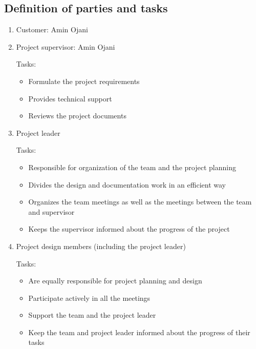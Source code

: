 \documentclass[a4paper,12pt]{article} \usepackage{graphicx}
\begin{document}
\subsection{Definition of parties and tasks}
\begin{enumerate}
        \item{Customer: Amin Ojani}
        \item{Project supervisor: Amin Ojani}

                Tasks:
                \begin{itemize}
                        \item{Formulate the project requirements}
                        \item{Provides technical support}
                        \item{Reviews the project documents}
                \end{itemize}
        \item{Project leader}

                Tasks:
                \begin{itemize}
                        \item{Responsible for organization of the team and the project planning}
                        \item{Divides the design and documentation work in an efficient way}
                        \item{Organizes the team meetings as well as the meetings between the team and supervisor}
                        \item{Keeps the supervisor informed about the progress of the project}
                \end{itemize}
        \item{Project design members (including the project leader)}

                Tasks:
                \begin{itemize}
                        \item{Are equally responsible for project planning and design}
                        \item{Participate actively in all the meetings}
                        \item{Support the team and the project leader}
                        \item{Keep the team and project leader informed about the progress of their tasks}
                \end{itemize}
\end{enumerate}
\end{document}
